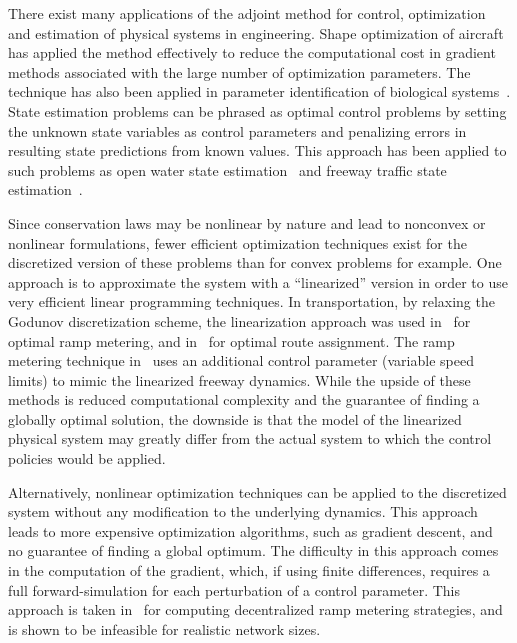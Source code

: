 There exist many applications of the adjoint method for control, optimization 
and estimation of physical systems in engineering. Shape optimization of 
aircraft~\cite{Reuther1996,Giles1997,Moin1994} has applied the method 
effectively to reduce the computational cost in gradient methods associated 
with the large number of optimization parameters. The technique has also been 
applied in parameter identification of biological systems~\cite{Raffard2008}. 
State estimation problems can be phrased as optimal control problems by setting 
the unknown state variables as control parameters and penalizing errors in 
resulting state predictions from known values. This approach has been applied 
to such problems as open water state estimation~\cite{Castaings2006,Strub2009} 
and freeway traffic state estimation~\cite{Jacqueta}.

Since conservation laws may be nonlinear by nature and lead to nonconvex or 
nonlinear formulations, fewer efficient optimization techniques exist for the 
discretized version of these problems than for convex problems for example. One 
approach is to approximate the system with a ``linearized'' version in order to 
use very efficient linear programming techniques. In transportation, by 
relaxing the Godunov discretization scheme, the linearization approach was used 
in~\cite{gomes2006optimal} for optimal ramp metering, and 
in~\cite{ziliaskopoulos2000linear} for optimal route assignment. The ramp 
metering technique in~\cite{Muralidharana} uses an additional control parameter 
(variable speed limits) to mimic the linearized freeway dynamics. While the 
upside of these methods is reduced computational complexity and the guarantee 
of finding a globally optimal solution, the downside is that the model of the 
linearized physical system may greatly differ from the actual system to which 
the control policies would be applied.

Alternatively, nonlinear optimization techniques can be applied to the 
discretized system without any modification to the underlying dynamics. This 
approach leads to more expensive optimization algorithms, such as gradient 
descent, and no guarantee of finding a global optimum. The difficulty in this 
approach comes in the computation of the gradient, which, if using finite 
differences, requires a full forward-simulation for each perturbation of a 
control parameter. This approach is taken in~\cite{Ramon2013,Frejo2011} for 
computing decentralized ramp metering strategies, and is shown to be infeasible 
for realistic network sizes.

